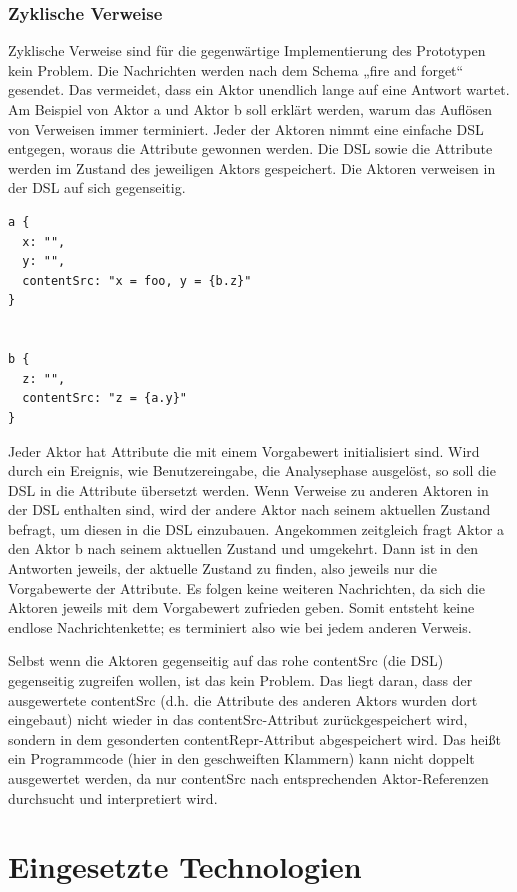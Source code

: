  
\subsubsection{Zyklische Verweise}\label{}

 
Zyklische Verweise sind für die gegenwärtige Implementierung des Prototypen kein Problem. Die Nachrichten werden nach dem Schema „fire and forget“ gesendet. Das vermeidet, dass ein Aktor unendlich lange auf eine Antwort wartet. Am Beispiel von Aktor a und Aktor b soll erklärt werden, warum das Auflösen von Verweisen immer terminiert. Jeder der Aktoren nimmt eine einfache DSL entgegen, woraus die Attribute gewonnen werden. Die DSL sowie die Attribute werden im Zustand des jeweiligen Aktors gespeichert. Die Aktoren verweisen in der DSL auf sich gegenseitig.

 
\begin{verbatim}
a {
  x: "",
  y: "",
  contentSrc: "x = foo, y = {b.z}"
}


b {
  z: "",
  contentSrc: "z = {a.y}"
}
\end{verbatim}
 
Jeder Aktor hat Attribute die mit einem Vorgabewert initialisiert sind. Wird durch ein Ereignis, wie Benutzereingabe, die Analysephase ausgelöst, so soll die DSL in die Attribute übersetzt werden. Wenn Verweise zu anderen Aktoren in der DSL enthalten sind, wird der andere Aktor nach seinem aktuellen Zustand befragt, um diesen in die DSL einzubauen. Angekommen zeitgleich fragt Aktor a den Aktor b nach seinem aktuellen Zustand und umgekehrt. Dann ist in den Antworten jeweils, der aktuelle Zustand zu finden, also jeweils nur die Vorgabewerte der Attribute. Es folgen keine weiteren Nachrichten, da sich die Aktoren jeweils mit dem Vorgabewert zufrieden geben. Somit entsteht keine endlose Nachrichtenkette; es terminiert also wie bei jedem anderen Verweis.

 
Selbst wenn die Aktoren gegenseitig auf das rohe contentSrc (die DSL) gegenseitig zugreifen wollen, ist das kein Problem. Das liegt daran, dass der ausgewertete contentSrc (d.h. die Attribute des anderen Aktors wurden dort eingebaut) nicht wieder in das contentSrc-Attribut zurückgespeichert wird, sondern in dem gesonderten contentRepr-Attribut abgespeichert wird. Das heißt ein Programmcode (hier in den geschweiften Klammern) kann nicht doppelt ausgewertet werden, da nur contentSrc nach entsprechenden Aktor-Referenzen durchsucht und interpretiert wird.

 
\section{Eingesetzte Technologien}\label{}
 
